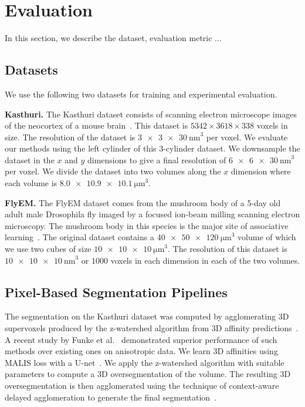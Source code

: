 \section{Evaluation}
In this section, we describe the dataset, evaluation metric ...

\subsection{Datasets}
\label{sec:dataset}

We use the following two datasets for training and experimental evaluation.

\noindent\textbf{Kasthuri.}
The Kasthuri dataset consists of scanning electron microscope images of the neocortex of a mouse brain~\cite{kasthuri2015saturated}. This dataset is $5342 \times 3618 \times 338$ voxels in size. The resolution of the dataset is $\SI[product-units=single]{3 x 3 x 30}{\nano\meter}^3$ per voxel. We evaluate our methods using the left cylinder of this 3-cylinder dataset. We downsample the dataset in the $x$ and $y$ dimensions to give a final resolution of $\SI[product-units=single]{6 x 6 x 30}{\nano\meter}^3$ per voxel. We divide the dataset into two volumes along the $x$ dimension where each volume is $\SI[product-units=single]{8.0 x 10.9 x 10.1}{\micro\meter}^3$.

\noindent\textbf{FlyEM.}
The FlyEM dataset comes from the mushroom body of a 5-day old adult male Drosophila fly imaged by a focused ion-beam milling scanning electron microscopy.  The mushroom body in this species is the major site of associative learning~\cite{takemura2017connectome}. The original dataset contains a $\SI[product-units=single]{40 x 50 x 120}{\micro\meter}^3$ volume of which we use two cubes of size $\SI[product-units=single]{10 x 10 x 10}{\micro\meter}^3$. The resolution of this dataset is $\SI[product-units=single]{10 x 10 x 10}{\nano\meter}^3$ or $1000$ voxels in each dimension in each of the two volumes.

\subsection{Pixel-Based Segmentation Pipelines}
\label{sec:neuroproof}

The segmentation on the Kasthuri dataset was computed by agglomerating 3D supervoxels produced by the z-watershed algorithm from 3D affinity predictions~\cite{zlateski2015image}. A recent study by Funke et al.~\cite{schlegel2017learning} demonstrated superior performance of such methods over existing ones on anisotropic data. We learn 3D affinities using MALIS loss with a U-net~\cite{Turaga:2009,ronneberger2015u}. We apply the z-watershed algorithm with suitable parameters to compute a 3D oversegmentation of the volume. The resulting 3D oversegmentation is then agglomerated using the technique of context-aware delayed agglomeration to generate the final segmentation~\cite{10.1371/journal.pone.0125825}.

